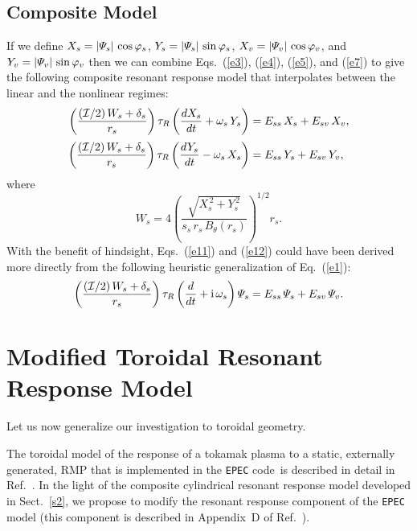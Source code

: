 \documentclass[12pt,prb,aps]{revtex4-1}
\begin{document}
\subsection{Composite Model}
If we define $X_s = |{\mit\Psi}_s|\,\cos\varphi_s$, $Y_s = |{\mit\Psi}_s|\,\sin\varphi_s$, $X_v = |{\mit\Psi}_v|\,\cos\varphi_v$, and $Y_v = |{\mit\Psi}_v|\,\sin\varphi_v$ 
then we can combine Eqs.~(\ref{e3}), (\ref{e4}), (\ref{e5}), and (\ref{e7}) to give the following
composite resonant response model that interpolates between the linear and the nonlinear
regimes:\,\cite{slip1,slip2,slip3}
\begin{align}\label{e11}
\left(\frac{({\cal I}/2)\,W_s+\delta_s}{r_s}\right)\tau_R\left(\frac{dX_s}{dt}+\omega_s\,Y_s\right)&= E_{ss}\,X_s + E_{sv}\,X_v,\\[0.5ex]
\left(\frac{({\cal I}/2)\,W_s+\delta_s}{r_s}\right)\tau_R\left(\frac{dY_s}{dt}-\omega_s\,X_s\right)& = E_{ss}\,Y_s + E_{sv}\,Y_v,\label{e12}
\end{align}
where
\begin{equation}\label{e23x}
W_s = 4\left(\frac{\sqrt{X_s^{\,2}+Y_s^{\,2}}}{s_s\,r_s\,B_\theta(r_s)}\right)^{1/2} r_s.
\end{equation}
With the benefit of hindsight, Eqs.~(\ref{e11}) and (\ref{e12}) could have been derived more directly from the
following heuristic generalization of Eq.~(\ref{e1}):\,\cite{slip2}
\begin{equation}
\left(\frac{({\cal I}/2)\,W_s+\delta_s}{r_s}\right)\tau_R\left(\frac{d}{dt}+{\rm i}\,\omega_s\right){\mit\Psi}_s= E_{ss}\,{\mit\Psi}_s+E_{sv}\,{\mit\Psi}_v.
\end{equation}

\section{Modified Toroidal Resonant Response Model}\label{s3}
Let us now generalize our investigation to toroidal geometry. 

The toroidal model of the response of a tokamak plasma to a static, externally generated, RMP that is implemented in the {\tt EPEC} code\,\cite{rftor1} is described in
detail in Ref.~. In the light of the composite cylindrical resonant response model developed in Sect.~\ref{s2}, we propose to 
modify the resonant  response component of the {\tt EPEC} model (this component is described in Appendix~D of Ref.~).
\end{document}
